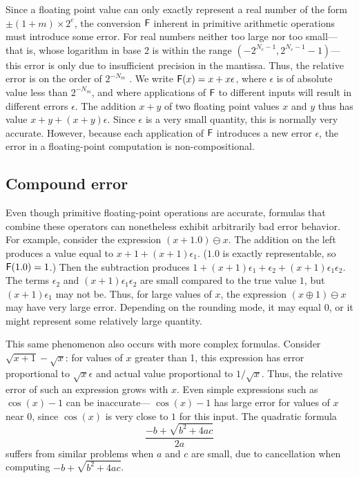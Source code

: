 \documentclass[paper.tex]{subfiles}
\begin{document}
Since a floating point value can only exactly represent a real number
of the form $\pm(1 + m) \times 2^e$, the conversion $\mathsf{F}$ inherent in
primitive arithmetic operations must introduce some error.  For real
numbers neither too large nor too small---%
that is, whose logarithm in base 2 is within the range $(-2^{N_e-1},
2^{N_e-1} - 1)$---%
this error is only due to insufficient precision in the mantissa.
Thus, the relative error is on the order of $2^{-N_m}$ .  We write $\mathsf{F}(x) = x + x\epsilon$, where $\epsilon$
is of absolute value less than $2^{-N_m}$, and where applications of
$\mathsf{F}$ to different inputs will result in different errors $\epsilon$.
The addition $x + y$ of two floating point values $x$ and $y$
thus has value $x + y + (x + y)\epsilon$.  Since $\epsilon$ is a very
small quantity, this is normally very accurate.  However, because each
application of $\mathsf{F}$ introduces a new error $\epsilon$, the error in a
floating-point computation is non-compositional.

\subsection{Compound error}

Even though primitive floating-point operations are accurate, formulas
that combine these operators can nonetheless exhibit arbitrarily bad
error behavior.  For example, consider the expression $(x + 1.0)
\ominus x$.  The addition on the left produces a value equal to $x + 1
+ (x + 1)\epsilon_1$.  ($1.0$ is exactly representable, so $\mathsf{F}(1.0) =
1$.)  Then the subtraction produces $1 + (x + 1) \epsilon_1 +
\epsilon_2 + (x + 1) \epsilon_1 \epsilon_2$.  The terms $\epsilon_2$
and $(x+1)\epsilon_1\epsilon_2$ are small compared to the true value
$1$, but $(x + 1) \epsilon_1$ may not be.  Thus, for large values of
$x$, the expression $(x \oplus 1) \ominus x$ may have very large
error.  Depending on the rounding mode, it may equal $0$, or it might
represent some relatively large quantity.

This same phenomenon also occurs with more complex formulas.  Consider
$\sqrt{x + 1} - \sqrt{x}$: for values of $x$ greater than
1, this expression has error proportional to $\sqrt{x} \epsilon$ and
actual value proportional to $1 / \sqrt{x}$.  Thus, the relative
error of such an expression grows with $x$.  Even simple expressions
such as $\cos(x) - 1$ can be inaccurate---%
$\cos(x) - 1$ has large error for values of $x$ near 0, since
$\cos(x)$ is very close to $1$ for this input.  The quadratic
formula \[\frac{-b + \sqrt{b^2 + 4 a c}}{2 a}\] suffers from similar
problems when $a$ and $c$ are small, due to cancellation when
computing $-b + \sqrt{b^2 + 4 a c}$.
\end{document}
